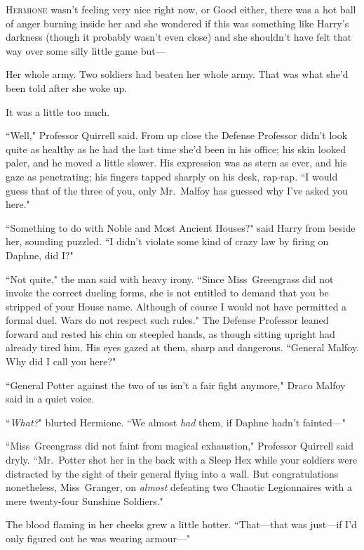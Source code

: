 
\lettrine{H}{ermione} wasn't feeling very nice right now, or Good either, there was a hot ball of anger burning inside her and she wondered if this was something like Harry's darkness (though it probably wasn't even close) and she shouldn't have felt that way over some silly little game but---

Her whole army. Two soldiers had beaten her whole army. That was what she'd been told after she woke up.

It was a little too much.

``Well," Professor Quirrell said. From up close the Defense Professor didn't look quite as healthy as he had the last time she'd been in his office; his skin looked paler, and he moved a little slower. His expression was as stern as ever, and his gaze as penetrating; his fingers tapped sharply on his desk, rap-rap. ``I would guess that of the three of you, only Mr.~Malfoy has guessed why I've asked you here."

``Something to do with Noble and Most Ancient Houses?" said Harry from beside her, sounding puzzled. ``I didn't violate some kind of crazy law by firing on Daphne, did I?"

``Not quite," the man said with heavy irony. ``Since Miss~Greengrass did not invoke the correct dueling forms, she is not entitled to demand that you be stripped of your House name. Although of course I would not have permitted a formal duel. Wars do not respect such rules." The Defense Professor leaned forward and rested his chin on steepled hands, as though sitting upright had already tired him. His eyes gazed at them, sharp and dangerous. ``General Malfoy. Why did I call you here?"

``General Potter against the two of us isn't a fair fight anymore," Draco Malfoy said in a quiet voice.

``\emph{What?}" blurted Hermione. ``We almost \emph{had} them, if Daphne hadn't fainted---"

``Miss~Greengrass did not faint from magical exhaustion," Professor Quirrell said dryly. ``Mr.~Potter shot her in the back with a Sleep Hex while your soldiers were distracted by the sight of their general flying into a wall. But congratulations nonetheless, Miss~Granger, on \emph{almost} defeating two Chaotic Legionnaires with a mere twenty-four Sunshine Soldiers."

The blood flaming in her cheeks grew a little hotter. ``That---that was just---if I'd only figured out he was wearing armour---"

